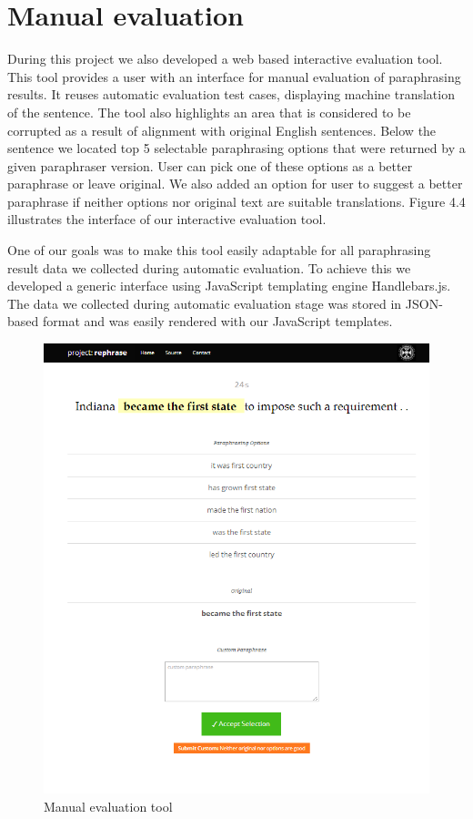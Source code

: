 \section{Manual evaluation}

During this project we also developed a web based interactive evaluation tool. This tool provides a user with an interface for manual evaluation of paraphrasing results. It reuses automatic evaluation test cases, displaying machine translation of the sentence. The tool also highlights an area that is considered to be corrupted as a result of alignment with original English sentences. Below the sentence we located top 5 selectable paraphrasing options that were returned by a given paraphraser version. User can pick one of these options as a better paraphrase or leave original. We also added an option for user to suggest a better paraphrase if neither options nor original text are suitable translations. Figure 4.4 illustrates the interface of our interactive evaluation tool. 

One of our goals was to make this tool easily adaptable for all paraphrasing result data we collected during automatic evaluation. To achieve this we developed a generic interface using JavaScript templating engine Handlebars.js. The data we collected during automatic evaluation stage was stored in JSON-based format and was easily rendered with our JavaScript templates.

\begin{figure}
 \centering 
 \includegraphics[scale=0.8]{g/man-eval.png}
 \caption{Manual evaluation tool}
\end{figure}

